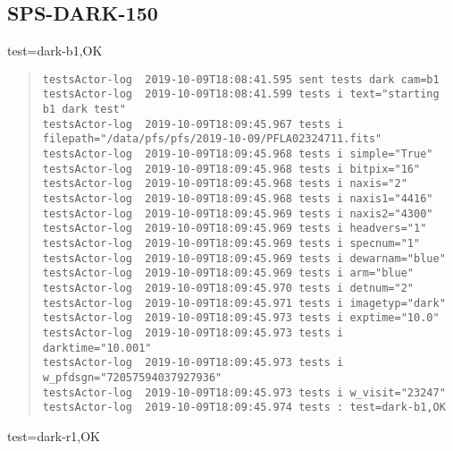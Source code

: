 \subsection{SPS-DARK-150}
\label{sec:tc-150}

test=dark-b1,OK

\begin{quote}
\begin{tiny}
\begin{verbatim}
testsActor-log  2019-10-09T18:08:41.595 sent tests dark cam=b1
testsActor-log  2019-10-09T18:08:41.599 tests i text="starting b1 dark test"
testsActor-log  2019-10-09T18:09:45.967 tests i filepath="/data/pfs/pfs/2019-10-09/PFLA02324711.fits"
testsActor-log  2019-10-09T18:09:45.968 tests i simple="True"
testsActor-log  2019-10-09T18:09:45.968 tests i bitpix="16"
testsActor-log  2019-10-09T18:09:45.968 tests i naxis="2"
testsActor-log  2019-10-09T18:09:45.968 tests i naxis1="4416"
testsActor-log  2019-10-09T18:09:45.969 tests i naxis2="4300"
testsActor-log  2019-10-09T18:09:45.969 tests i headvers="1"
testsActor-log  2019-10-09T18:09:45.969 tests i specnum="1"
testsActor-log  2019-10-09T18:09:45.969 tests i dewarnam="blue"
testsActor-log  2019-10-09T18:09:45.969 tests i arm="blue"
testsActor-log  2019-10-09T18:09:45.970 tests i detnum="2"
testsActor-log  2019-10-09T18:09:45.971 tests i imagetyp="dark"
testsActor-log  2019-10-09T18:09:45.973 tests i exptime="10.0"
testsActor-log  2019-10-09T18:09:45.973 tests i darktime="10.001"
testsActor-log  2019-10-09T18:09:45.973 tests i w_pfdsgn="72057594037927936"
testsActor-log  2019-10-09T18:09:45.973 tests i w_visit="23247"
testsActor-log  2019-10-09T18:09:45.974 tests : test=dark-b1,OK
\end{verbatim}
\end{tiny}
\end{quote}

\noindent test=dark-r1,OK

